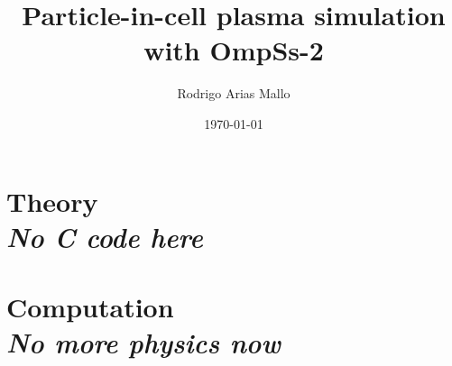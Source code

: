 \documentclass[a4paper,12pt]{book}
\title{Particle-in-cell plasma simulation with OmpSs-2}
\author{Rodrigo Arias Mallo}
\date{\today}
\begin{document}
\maketitle


\tableofcontents




\part{Theory\\ \small \textit{No C code here}}






\part{Computation\\ \small \textit{No more physics now}}







%
%





\end{document}
